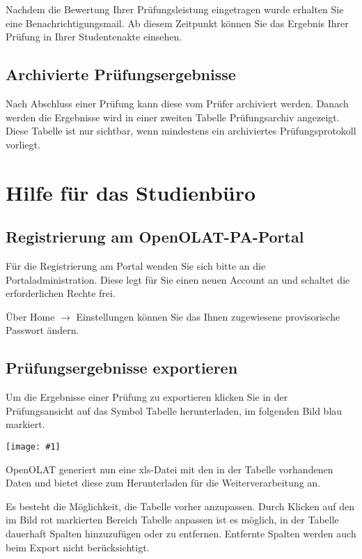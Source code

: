 \documentclass[a4paper,11pt]{article}
\newcommand{\bild}[1]{
    \begin{center}\texttt{[image: \#1]}\end{center}
}
\newcommand{\knopf}[1]{{\sc #1}}
\begin{document}
Nachdem die Bewertung Ihrer Prüfungsleistung eingetragen wurde
erhalten Sie eine Benachrichtigungsmail. Ab diesem Zeitpunkt können Sie
das Ergebnis Ihrer Prüfung in Ihrer Studentenakte einsehen.

\subsection{Archivierte Prüfungsergebnisse}

Nach Abschluss einer Prüfung kann diese vom Prüfer archiviert werden. Danach werden
die Ergebnisse wird in einer zweiten Tabelle \knopf{Prüfungsarchiv} angezeigt.
Diese Tabelle ist nur sichtbar, wenn mindestens ein archiviertes Prüfungsprotokoll
vorliegt.

\clearpage
\section{Hilfe für das Studienbüro}

\subsection{Registrierung am OpenOLAT-PA-Portal}

Für die Registrierung am Portal wenden Sie sich bitte an die
Portaladministration. Diese legt für Sie einen neuen Account an und schaltet die
erforderlichen Rechte frei.

Über \knopf{Home $\rightarrow$ Einstellungen} können Sie das Ihnen zugewiesene
provisorische Passwort ändern.

\subsection{Prüfungsergebnisse exportieren}

Um die Ergebnisse einer Prüfung zu exportieren klicken Sie in der
Prüfungsansicht auf das Symbol \knopf{Tabelle herunterladen}, im folgenden
Bild blau markiert.

\bild{exam-export}

OpenOLAT generiert nun eine xls-Datei mit den in der Tabelle vorhandenen Daten und
bietet diese zum Herunterladen für die Weiterverarbeitung an.

Es besteht die Möglichkeit, die Tabelle vorher anzupassen. Durch Klicken auf
den im Bild rot markierten Bereich \knopf{Tabelle anpassen} ist es möglich, in
der Tabelle dauerhaft Spalten hinzuzufügen oder zu entfernen. Entfernte Spalten werden
auch beim Export nicht berücksichtigt.
\end{document}
